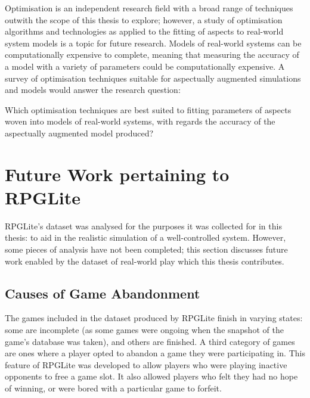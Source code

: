 Optimisation is an independent research field with a broad range
of techniques outwith the scope of this thesis to explore; however, a study of
optimisation algorithms and technologies as applied to the fitting of aspects to
real-world system models is a topic for future research. Models of real-world
systems can be computationally expensive to complete, meaning that measuring the
accuracy of a model with a variety of parameters could be computationally
expensive. A survey of optimisation techniques suitable for aspectually
augmented simulations and models would answer the research question:

\begin{researchquestion}
    Which optimisation techniques are best suited to fitting parameters of
    aspects woven into models of real-world systems, with regards the
    accuracy of the aspectually augmented model produced?
\end{researchquestion}



\section{Future Work pertaining to RPGLite}\label{sec:future_work_rpglite}
RPGLite's dataset was analysed for the purposes it was collected for in this
thesis: to aid in the realistic simulation of a well-controlled \sociotechnical
system. However, some pieces of analysis have not been completed; this section
discusses future work enabled by the dataset of real-world play which this
thesis contributes.

\subsection{Causes of Game Abandonment}\label{future_work_rpglite_abandonment_reasons}

The games included in the dataset produced by RPGLite finish in varying states:
some are incomplete (as some games were ongoing when the snapshot of the game's
database was taken), and others are finished. A third category of games are ones
where a player opted to abandon a game they were participating in. This feature
of RPGLite was developed to allow players who were playing inactive opponents to
free a game slot. It also allowed players who felt they had no hope of winning,
or were bored with a particular game to forfeit.

